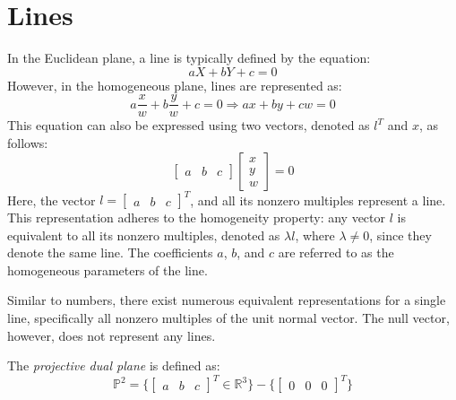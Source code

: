 \section{Lines}

In the Euclidean plane, a line is typically defined by the equation:
\[aX+bY+c=0\]
However, in the homogeneous plane, lines are represented as:
\[a\dfrac{x}{w}+b \dfrac{y}{w}+c=0 \Longrightarrow ax+by+cw=0\]
This equation can also be expressed using two vectors, denoted as $l^T$ and $x$, as follows:
\[\begin{bmatrix} a & b & c \end{bmatrix} \begin{bmatrix} x \\ y \\ w \end{bmatrix}=0\]
Here, the vector $l={\begin{bmatrix} a & b & c \end{bmatrix}}^T$, and all its nonzero multiples represent a line.  
This representation adheres to the homogeneity property: any vector $l$ is equivalent to all its nonzero multiples, denoted as $\lambda l$, where $\lambda\neq 0$, since they denote the same line. 
The coefficients $a$, $b$, and $c$ are referred to as the homogeneous parameters of the line.

Similar to numbers, there exist numerous equivalent representations for a single line, specifically all nonzero multiples of the unit normal vector. 
The null vector, however, does not represent any lines.
\begin{definition}
    The \emph{projective dual plane} is defined as: 
    \[\mathbb{P}^2=\{{\begin{bmatrix} a & b & c \end{bmatrix}}^T \in \mathbb{R}^3\}-\{{\begin{bmatrix} 0 & 0 & 0 \end{bmatrix}}^T\}\]
\end{definition}

